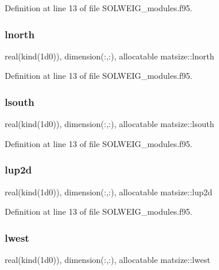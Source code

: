 Definition at line 13 of file S\+O\+L\+W\+E\+I\+G\+\_\+modules.\+f95.

\mbox{\label{namespacematsize_a5adfcfca2aa462e55a6ed15deb4c0138}} 
\subsubsection{\texorpdfstring{lnorth}{lnorth}}
{\footnotesize\ttfamily real(kind(1d0)), dimension(\+:,\+:), allocatable matsize\+::lnorth}



Definition at line 13 of file S\+O\+L\+W\+E\+I\+G\+\_\+modules.\+f95.

\mbox{\label{namespacematsize_aa28ab3bf60483b5f18b3785b75b8f859}} 
\subsubsection{\texorpdfstring{lsouth}{lsouth}}
{\footnotesize\ttfamily real(kind(1d0)), dimension(\+:,\+:), allocatable matsize\+::lsouth}



Definition at line 13 of file S\+O\+L\+W\+E\+I\+G\+\_\+modules.\+f95.

\mbox{\label{namespacematsize_a3337225f5c7bd795ed48fc7811611a59}} 
\subsubsection{\texorpdfstring{lup2d}{lup2d}}
{\footnotesize\ttfamily real(kind(1d0)), dimension(\+:,\+:), allocatable matsize\+::lup2d}



Definition at line 13 of file S\+O\+L\+W\+E\+I\+G\+\_\+modules.\+f95.

\mbox{\label{namespacematsize_a8fe9b02501cb74972025943f45f742b1}} 
\subsubsection{\texorpdfstring{lwest}{lwest}}
{\footnotesize\ttfamily real(kind(1d0)), dimension(\+:,\+:), allocatable matsize\+::lwest}



